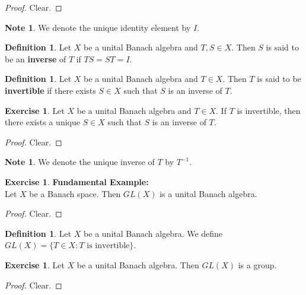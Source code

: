 \documentclass[12pt]{amsart}
\theoremstyle{definition}
\newtheorem{defn}[definition]{Definition}
\newtheorem{note}[definition]{Note}
\newtheorem{ex}[definition]{Exercise}
\begin{document}
		\begin{proof}
		Clear.
		\end{proof}
		
		\begin{note}
		We denote the unique identity element by $I$.
		\end{note}
		
		\begin{defn}
		Let $X$ be a unital Banach algebra and $T,S \in X$. Then $S$ is said to be an 
		\textbf{inverse} of $T$ if $TS=ST = I$.
		\end{defn}

		\begin{defn}
		Let $X$ be a unital Banach algebra and $T \in X$. 			Then $T$ is said to be 
		\textbf{invertible} if there exists $S \in X$ such 		that $S$ is an inverse of $T$.
		\end{defn}
		
		\begin{ex}
		Let $X$ be a unital Banach algebra and $T \in X$. If $T$ is invertible, then there exists a unique $S \in X$ such that $S$ is an inverse of $T$.
		\end{ex}
		
		\begin{proof}
		Clear.
		\end{proof}
		
		\begin{note}
		We denote the unique inverse of $T$ by $T^{-1}$.
		\end{note}
		
			
	\begin{ex}\textbf{Fundamental Example:} \\
	Let $X$ be a Banach space. Then $GL(X)$ is a unital Banach algebra.
	\end{ex}
	
	\begin{proof}
	Clear.
	\end{proof}
		
		\begin{defn}
		Let $X$ be a unital Banach algebra. We define $GL(X) = \{T \in X: T \text{ is invertible}\}$.
		\end{defn}
		
		\begin{ex}
		Let $X$ be a unital Banach algebra. Then $GL(X)$ is a group.  
	\end{ex}
	
	\begin{proof}
	Clear.
	\end{proof}
	
\end{document}
